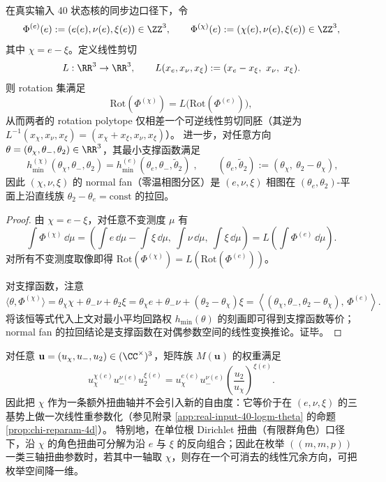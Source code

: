\begin{proposition}\label{prop:rotation-polytope-shear}
在真实输入 40 状态核的同步边口径下，令
\[
\Phi^{(e)}(e):=(e(e),\nu(e),\xi(e))\in\ZZ^3,
\qquad
\Phi^{(\chi)}(e):=(\chi(e),\nu(e),\xi(e))\in\ZZ^3,
\]
其中 \(\chi=e-\xi\)。定义线性剪切
\[
L:\RR^3\to\RR^3,\qquad L(x_e,x_\nu,x_\xi):=(x_e-x_\xi,\ x_\nu,\ x_\xi).
\]
则 rotation 集满足
\[
\mathrm{Rot}(\Phi^{(\chi)})=L\bigl(\mathrm{Rot}(\Phi^{(e)})\bigr),
\]
从而两者的 rotation polytope 仅相差一个可逆线性剪切同胚（其逆为 \(L^{-1}(x_\chi,x_\nu,x_\xi)=(x_\chi+x_\xi,x_\nu,x_\xi)\)）。
进一步，对任意方向 \(\theta=(\theta_\chi,\theta_-,\theta_2)\in\RR^3\)，其最小支撑函数满足
\[
\boxed{\;
h_{\min}^{(\chi)}(\theta_\chi,\theta_-,\theta_2)
=h_{\min}^{(e)}(\theta_e,\theta_-,\widetilde\theta_2)\;},
\qquad
(\theta_e,\widetilde\theta_2):=(\theta_\chi,\ \theta_2-\theta_\chi),
\]
因此 \((\chi,\nu,\xi)\) 的 normal fan（零温相图分区）是 \((e,\nu,\xi)\) 相图在 \((\theta_e,\theta_2)\)-平面上沿直线族 \(\theta_2-\theta_e=\mathrm{const}\) 的拉回。
\end{proposition}
\begin{proof}
由 \(\chi=e-\xi\)，对任意不变测度 \(\mu\) 有
\[
\int \Phi^{(\chi)}\,\dd\mu=\left(\int e\,\dd\mu-\int \xi\,\dd\mu,\ \int \nu\,\dd\mu,\ \int \xi\,\dd\mu\right)
=L\left(\int \Phi^{(e)}\,\dd\mu\right).
\]
对所有不变测度取像即得 \(\mathrm{Rot}(\Phi^{(\chi)})=L(\mathrm{Rot}(\Phi^{(e)}))\)。

对支撑函数，注意
\[
\langle\theta,\Phi^{(\chi)}\rangle
=\theta_\chi\chi+\theta_-\nu+\theta_2\xi
=\theta_\chi e+\theta_-\nu+(\theta_2-\theta_\chi)\xi
=\left\langle(\theta_\chi,\theta_-,\theta_2-\theta_\chi),\,\Phi^{(e)}\right\rangle.
\]
将该恒等式代入上文对最小平均回路权 \(h_{\min}(\theta)\) 的刻画即可得到支撑函数等价；normal fan 的拉回结论是支撑函数在对偶参数空间的线性变换推论。证毕。
\end{proof}

\begin{corollary}\label{cor:chi-twist-dimension-reduction}
对任意 \(\mathbf{u}=(u_\chi,u_-,u_2)\in(\CC^\times)^3\)，矩阵族 \(M(\mathbf{u})\) 的权重满足
\[
u_\chi^{\chi(e)}u_-^{\nu(e)}u_2^{\xi(e)}
=u_\chi^{e(e)}u_-^{\nu(e)}\left(\frac{u_2}{u_\chi}\right)^{\xi(e)}.
\]
因此把 \(\chi\) 作为一条额外扭曲轴并不会引入新的自由度：它等价于在 \((e,\nu,\xi)\) 的三基势上做一次线性重参数化（参见附录 \ref{app:real-input-40-logm-theta} 的命题 \ref{prop:chi-reparam-4d}）。
特别地，在单位根 Dirichlet 扭曲（有限群角色）口径下，沿 \(\chi\) 的角色扭曲可分解为沿 \(e\) 与 \(\xi\) 的反向组合；因此在枚举 \(((m,m,p))\) 一类三轴扭曲参数时，若其中一轴取 \(\chi\)，则存在一个可消去的线性冗余方向，可把枚举空间降一维。
\end{corollary}

